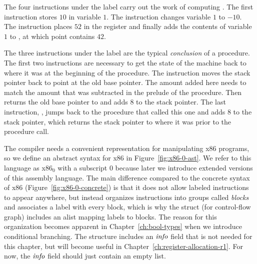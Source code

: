 \documentclass[11pt]{book}
\begin{document}
The four instructions under the label  carry out the work
of computing . The first instruction
 stores $10$ in variable $1$. The
instruction  changes variable $1$ to $-10$. The
instruction  places $52$ in the register  and
finally  adds the contents of variable $1$ to
, at which point  contains $42$.

The three instructions under the label  are the
typical \emph{conclusion} of a procedure.  The first two instructions
are necessary to get the state of the machine back to where it was at
the beginning of the procedure.  The instruction  moves the stack pointer back to point at the old base
pointer. The amount added here needs to match the amount that was
subtracted in the prelude of the procedure. Then 
returns the old base pointer to  and adds $8$ to the stack
pointer.  The last instruction, , jumps back to the
procedure that called this one and adds 8 to the stack pointer, which
returns the stack pointer to where it was prior to the procedure call.

The compiler needs a convenient representation for manipulating x86
programs, so we define an abstract syntax for x86 in
Figure~\ref{fig:x86-0-ast}. We refer to this language as x86$_0$ with
a subscript $0$ because later we introduce extended versions of this
assembly language. The main difference compared to the concrete syntax
of x86 (Figure~\ref{fig:x86-0-concrete}) is that it does not allow labeled
instructions to appear anywhere, but instead organizes instructions
into groups called \emph{blocks} and associates a label with every
block, which is why the  struct (for control-flow graph)
includes an alist mapping labels to blocks. The reason for this
organization becomes apparent in Chapter~\ref{ch:bool-types} when we
introduce conditional branching. The  structure includes
an $\mathit{info}$ field that is not needed for this chapter, but will
become useful in Chapter~\ref{ch:register-allocation-r1}.  For now,
the $\mathit{info}$ field should just contain an empty list.
\end{document}
